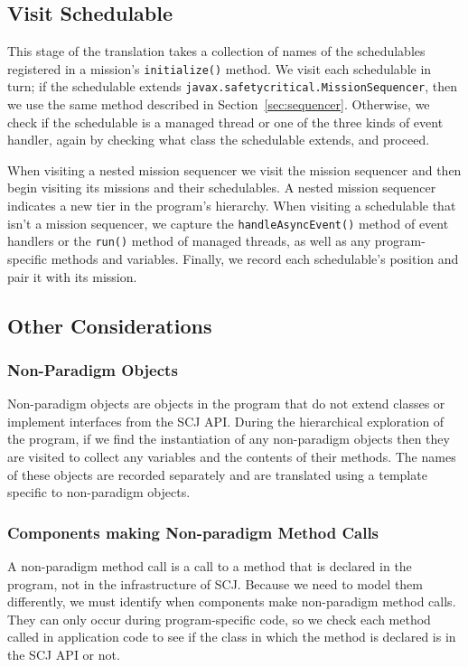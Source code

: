 \documentclass[10pt,a4paper]{article}
\begin{document}
\subsection{Visit Schedulable}
\label{sec:schedulables}

This stage of the translation takes a collection of names of the schedulables registered in a mission's \texttt{initialize()} method. We visit each schedulable in turn; if the schedulable extends \texttt{javax.safetycritical.MissionSequencer}, then we use the same method described in Section~\ref{sec:sequencer}. Otherwise, we check if the schedulable is a managed thread or one of the three kinds of event handler, again by checking what class the schedulable extends, and proceed.

When visiting a nested mission sequencer we visit the mission sequencer and then begin visiting its missions and their schedulables. A nested mission sequencer indicates a new tier in the program's hierarchy. When visiting a schedulable that isn't a mission sequencer, we capture the \texttt{handleAsyncEvent()} method of event handlers or the \texttt{run()} method of managed threads, as well as any program-specific methods and variables. Finally, we record each schedulable’s position and pair it with its mission.

\subsection{Other Considerations}
\label{sec:other}

\subsubsection{Non-Paradigm Objects}

Non-paradigm objects are objects in the program that do not extend classes or implement interfaces from the SCJ API. During the hierarchical exploration of the program, if we find the instantiation of any non-paradigm objects then they are visited to collect any variables and the contents of their methods. The names of these objects are recorded separately and are translated using a template specific to non-paradigm objects.

\subsubsection{Components making Non-paradigm Method Calls}

A non-paradigm method call is a call to a method that is declared in the program, not in the infrastructure of SCJ. Because we need to model them differently, we must identify when components make non-paradigm method calls. They can only occur during program-specific code, so we check each method called in application code to see if the class in which the method is declared is in the SCJ API or not. 
\end{document}
